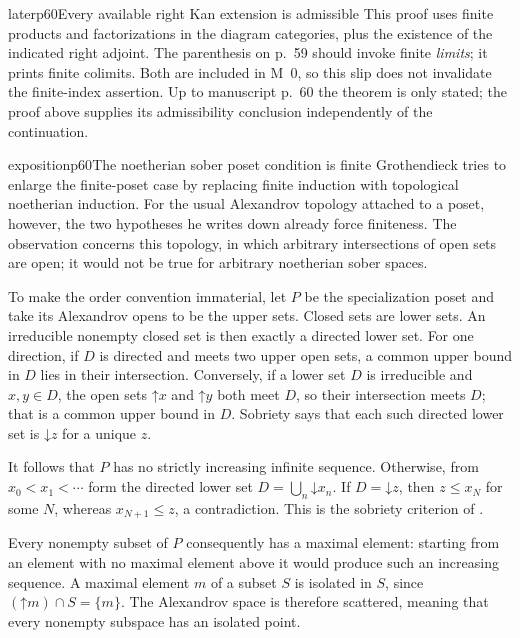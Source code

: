 \begin{dcomment}{later}{p60}{Every available right Kan extension is admissible}
This proof uses finite products and factorizations in the diagram categories, plus the existence of the indicated right adjoint. The parenthesis on p.~59 should invoke finite \emph{limits}; it prints finite colimits. Both are included in M~0, so this slip does not invalidate the finite-index assertion. Up to manuscript p.~60 the theorem is only stated; the proof above supplies its admissibility conclusion independently of the continuation.
\end{dcomment}

\begin{dcomment}{exposition}{p60}{The noetherian sober poset condition is finite}
Grothendieck tries to enlarge the finite-poset case by replacing finite induction with topological noetherian induction. For the usual Alexandrov topology attached to a poset, however, the two hypotheses he writes down already force finiteness. The observation concerns this topology, in which arbitrary intersections of open sets are open; it would not be true for arbitrary noetherian sober spaces.

To make the order convention immaterial, let $P$ be the specialization poset and take its Alexandrov opens to be the upper sets. Closed sets are lower sets. An irreducible nonempty closed set is then exactly a directed lower set. For one direction, if $D$ is directed and meets two upper open sets, a common upper bound in $D$ lies in their intersection. Conversely, if a lower set $D$ is irreducible and $x,y\in D$, the open sets $\mathord\uparrow x$ and $\mathord\uparrow y$ both meet $D$, so their intersection meets $D$; that is a common upper bound in $D$. Sobriety says that each such directed lower set is $\mathord\downarrow z$ for a unique $z$.

It follows that $P$ has no strictly increasing infinite sequence. Otherwise, from $x_0<x_1<\cdots$ form the directed lower set $D=\bigcup_n\mathord\downarrow x_n$. If $D=\mathord\downarrow z$, then $z\leq x_N$ for some $N$, whereas $x_{N+1}\leq z$, a contradiction. This is the sobriety criterion of \citet[Chapter~II, Proposition~6.4.4]{PicadoPultr2012}.

Every nonempty subset of $P$ consequently has a maximal element: starting from an element with no maximal element above it would produce such an increasing sequence. A maximal element $m$ of a subset $S$ is isolated in $S$, since $(\mathord\uparrow m)\cap S=\{m\}$. The Alexandrov space is therefore scattered, meaning that every nonempty subspace has an isolated point.


\end{dcomment}
